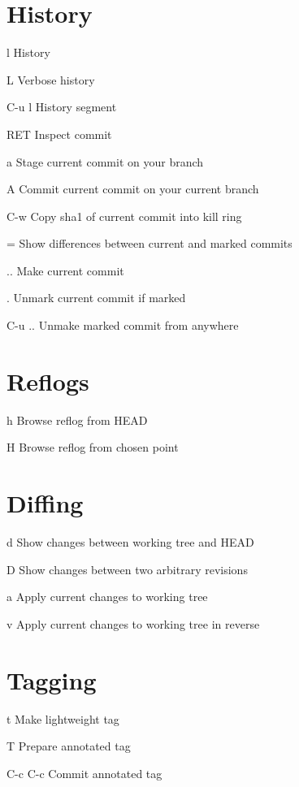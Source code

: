 \documentclass[11pt,a4paper]{article}
\begin{document}
\begin{multicols}{2}
\section{History}
\begin{eqlist}
\item[l] History
\item[L] Verbose history
\item[C-u l] History segment
\item[RET] Inspect commit
\item[a] Stage current commit on your branch
\item[A] Commit current commit on your current branch
\item[C-w] Copy sha1 of current commit into kill ring
\item[=] Show differences between current and marked commits
\item[..] Make current commit
\item[.] Unmark current commit if marked
\item[C-u ..] Unmake marked commit from anywhere
\end{eqlist}

\section{Reflogs}
\begin{eqlist}
\item[h] Browse reflog from HEAD
\item[H] Browse reflog from chosen point
\end{eqlist}

\section{Diffing}
\begin{eqlist}
\item[d] Show changes between working tree and HEAD
\item[D] Show changes between two arbitrary revisions
\item[a] Apply current changes to working tree
\item[v] Apply current changes to working tree in reverse
\end{eqlist}

\section{Tagging}
\begin{eqlist}
\item[t] Make lightweight tag
\item[T] Prepare annotated tag
\item[C-c C-c] Commit annotated tag
\end{eqlist}


\end{multicols}
\end{document}
